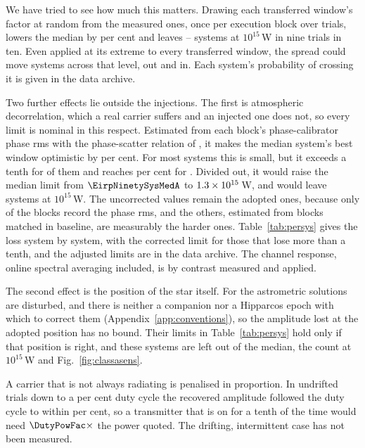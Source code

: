 We have tried to see how much this matters. Drawing each transferred
window's factor at random from the measured ones, once per execution block
over \SvNTrial{} trials, lowers the median by \SvRsMedShiftPct{} per cent and
leaves \SvRsBlkNLo--\SvRsBlkNHi{} systems at $10^{15}$\,W in nine trials in
ten. Even applied at its extreme to every transferred window, the spread
could move \SvSprN{} systems across that level, \SvSprNOut{} out and
\SvSprNIn{} in. Each system's probability of crossing it is given in the
data archive.

Two further effects lie outside the injections. The first is atmospheric
decorrelation, which a real carrier suffers and an injected one does not, so
every limit is nominal in this respect. Estimated from each block's
phase-calibrator phase rms \citep[\S\S10.4.11, 11.3.1]{ALMAHandbook} with the
phase-scatter relation of \citet[Eq.~3]{Richards2022}, it makes the median
system's best window optimistic by \NmDecSysMedPct{} per cent. For most
systems this is small, but it exceeds a tenth for \NmDecNBigSys{} of them and
reaches \NmDecSysWorstPct{} per cent for \NmDecSysWorstName. Divided out, it
would raise the median limit from $\EirpNinetySysMedA$ to
$1.3\times10^{15}$\,W, and would leave
\NmDecAdjNEfifteen{} systems at $10^{15}$\,W. The
uncorrected values remain the adopted ones, because only \SensDecorNBlk{} of
the \SensDecorNBlkTot{} blocks record the phase rms, and the others,
estimated from blocks matched in baseline, are measurably the harder ones.
Table~\ref{tab:persys} gives the loss system by system, with the
corrected limit for those that lose more than a tenth,
and the adjusted limits are in the data archive. The
channel response, online spectral averaging included, is by contrast
measured and applied.

The second effect is the position of the star itself. For \OmFlagStars{} the
astrometric solutions are disturbed, and there is neither a companion nor a
Hipparcos epoch with which to correct them
(Appendix~\ref{app:conventions}), so the amplitude lost at the adopted
position has no bound. Their limits in Table~\ref{tab:persys} hold only if
that position is right, and these \OmNFlagWord{} systems are left out of the
median, the count at $10^{15}$\,W and Fig.~\ref{fig:classasens}.

A carrier that is not always radiating is penalised in proportion. In
\DutyNTrial{} undrifted trials down to a \DutyCycleMinPct{} per cent duty
cycle the recovered amplitude followed the duty cycle to within
\DutyAttenDevPct{} per cent, so a transmitter that is on for a tenth of the
time would need $\DutyPowFac\times$ the power quoted. The drifting,
intermittent case has not been measured.

